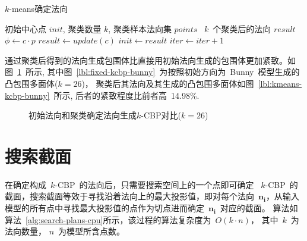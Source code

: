\begin{algorithm}
\small
\caption{$k$-means确定法向}
\label{alg:kmeans-determine-normals}
\begin{algorithmic}[1]
\Require
初始中心点 $init$, 聚类数量 $k$, 聚类样本法向集 $points$
\Ensure
~$k$~个聚类后的法向 $result$
        \State $\phi \gets c \cdot p$ 
    \EndFor
        \State $result \gets update(c)$ 
        \State {}
        \State {}
    \Else
        \State $init \gets result $
        \State $iter \gets iter+1 $
    \EndIf
    \EndFor
  \EndFor
\EndFunction
\end{algorithmic}
\end{algorithm}


通过聚类后得到的法向生成包围体比直接用初始法向生成的包围体更加紧致。如图~\ref{lbl:kemans-fixed-kcbp}~所示, 
其中图~\ref{lbl:fixed-kcbp-bunny}~为按照初始方向为~Bunny~模型生成的凸包围多面体($k=26$)，
聚类后其法向及其生成的凸包围多面体如图~\ref{lbl:kmeans-kcbp-bunny}~所示, 后者的紧致程度比前者高~14.98\%.

\begin{figure}[htbp]
\setcounter{subfigure}{0}
  \centering
  \hspace{3em}%
  \hspace{3em}%
  \caption{初始法向和聚类确定法向生成$k$-CBP对比($k=26$)}
  \label{lbl:kemans-fixed-kcbp}
\end{figure}

\section{搜索截面}
\label{sec:search:planes}

在确定构成~$k$-CBP~的法向后，只需要搜索空间上的一个点即可确定
~$k$-CBP~的截面，搜索截面等效于寻找沿着法向上的最大投影值，即对每个法向~$\bm{n_i}$，从输入模型的所有点中寻找最大投影值的点作为切点进而确定~$\bm{n_i}$~对应的截面。
算法如算法~\ref{alg:search-plans-cpu}所示，该过程的算法复杂度为~$O(k\cdot
n)$， 其中~$k$~为法向数量， $n$~为模型所含点数。



